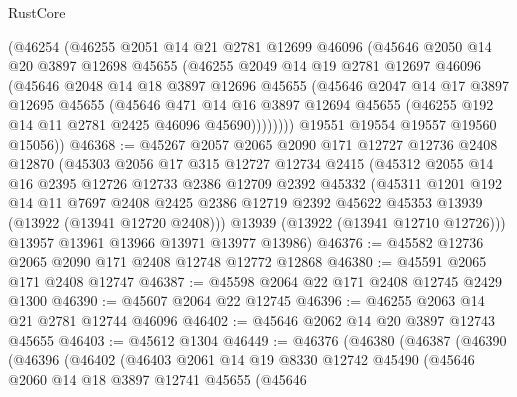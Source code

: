 \begin{lexlean}{RustCore}
\begin{coremodule}
        (@46254
          (@46255
            @2051
            @14
            @21
            @2781
            @12699
            @46096
            (@45646
              @2050
              @14
              @20
              @3897
              @12698
              @45655
              (@46255
                @2049
                @14
                @19
                @2781
                @12697
                @46096
                (@45646
                  @2048
                  @14
                  @18
                  @3897
                  @12696
                  @45655
                  (@45646
                    @2047
                    @14
                    @17
                    @3897
                    @12695
                    @45655
                    (@45646
                      @471
                      @14
                      @16
                      @3897
                      @12694
                      @45655
                      (@46255 @192 @14 @11 @2781 @2425 @46096 @45690))))))))
        @19551
        @19554
        @19557
        @19560
        @15056))
@46368 := @45267
    @2057
    @2065
    @2090
    @171
    @12727
    @12736
    @2408
    @12870
    (@45303
      @2056
      @17
      @315
      @12727
      @12734
      @2415
      (@45312
        @2055
        @14
        @16
        @2395
        @12726
        @12733
        @2386
        @12709
        @2392
        @45332
        (@45311
          @1201
          @192
          @14
          @11
          @7697
          @2408
          @2425
          @2386
          @12719
          @2392
          @45622
          @45353
          @13939
          (@13922 (@13941 @12720 @2408)))
        @13939
        (@13922 (@13941 @12710 @12726)))
      @13957
      @13961
      @13966
      @13971
      @13977
      @13986)
@46376 := @45582 @12736 @2065 @2090 @171 @2408 @12748 @12772 @12868
@46380 := @45591 @2065 @171 @2408 @12747
@46387 := @45598 @2064 @22 @171 @2408 @12745 @2429 @1300
@46390 := @45607 @2064 @22 @12745
@46396 := @46255 @2063 @14 @21 @2781 @12744 @46096
@46402 := @45646 @2062 @14 @20 @3897 @12743 @45655
@46403 := @45612 @1304
@46449 := @46376
    (@46380
      (@46387
        (@46390
          (@46396
            (@46402
              (@46403
                @2061
                @14
                @19
                @8330
                @12742
                @45490
                (@45646
                  @2060
                  @14
                  @18
                  @3897
                  @12741
                  @45655
                  (@45646

\end{coremodule}
\end{lexlean}
